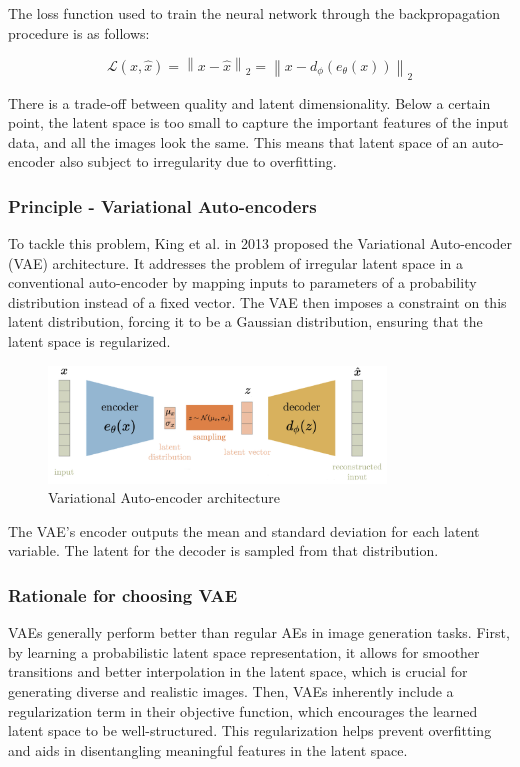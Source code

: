 \documentclass{article}
\begin{document}
The loss function used to train the neural network through the backpropagation procedure is as follows: 

\[\mathcal{L}(x,\hat{x})=\left\| x-\hat{x}\right\|_{2}=\left\| x-d_{\phi}(e_{\theta}(x)) \right\|_{2}\]

There is a trade-off between quality and latent dimensionality. Below a certain point, the latent space is too small to capture the important features of the input data, and all the images look the same.
This means that latent space of an auto-encoder also subject to irregularity due to overfitting. 

\subsubsection*{Principle - Variational Auto-encoders}
To tackle this problem, King et al. in 2013 proposed the Variational Auto-encoder (VAE) architecture. It addresses the problem of irregular latent space in a conventional auto-encoder by mapping inputs to parameters of a probability distribution instead of a fixed vector.
The VAE then imposes a constraint on this latent distribution, forcing it to be a Gaussian distribution, ensuring that the latent space is regularized.

\begin{figure}[H]
    \centering
    \includegraphics[width=0.8\textwidth]{images/vae.png}
    \caption{Variational Auto-encoder architecture}
\end{figure}

The VAE's encoder outputs the mean and standard deviation for each latent variable. The latent for the decoder is sampled from that distribution.

\subsubsection*{Rationale for choosing VAE}
VAEs generally perform better than regular AEs in image generation tasks. 
First, by learning a probabilistic latent space representation, it allows for smoother transitions and better interpolation in the latent space, which is crucial for generating diverse and realistic images. 
Then, VAEs inherently include a regularization term in their objective function, which encourages the learned latent space to be well-structured. 
This regularization helps prevent overfitting and aids in disentangling meaningful features in the latent space.
  
\end{document}
